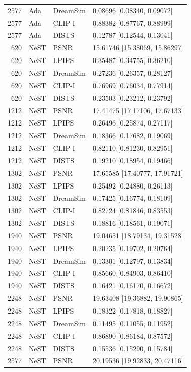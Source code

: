 \documentclass[10pt,letterpaper]{article}
\begin{document}
\begin{longtable}{@{}rlll@{}}
2577 & Ada & DreamSim & 0.08696 [0.08340, 0.09072]\\
2577 & Ada & CLIP-I & 0.88382 [0.87767, 0.88999]\\
2577 & Ada & DISTS & 0.12787 [0.12544, 0.13041]\\
620 & NeST & PSNR & 15.61746 [15.38069, 15.86297]\\
620 & NeST & LPIPS & 0.35487 [0.34755, 0.36210]\\
620 & NeST & DreamSim & 0.27236 [0.26357, 0.28127]\\
620 & NeST & CLIP-I & 0.76969 [0.76034, 0.77914]\\
620 & NeST & DISTS & 0.23503 [0.23212, 0.23792]\\
1212 & NeST & PSNR & 17.41475 [17.17106, 17.67133]\\
1212 & NeST & LPIPS & 0.26496 [0.25874, 0.27117]\\
1212 & NeST & DreamSim & 0.18366 [0.17682, 0.19069]\\
1212 & NeST & CLIP-I & 0.82110 [0.81230, 0.82951]\\
1212 & NeST & DISTS & 0.19210 [0.18954, 0.19466]\\
1302 & NeST & PSNR & 17.65585 [17.40777, 17.91721]\\
1302 & NeST & LPIPS & 0.25492 [0.24880, 0.26113]\\
1302 & NeST & DreamSim & 0.17425 [0.16774, 0.18109]\\
1302 & NeST & CLIP-I & 0.82724 [0.81846, 0.83553]\\
1302 & NeST & DISTS & 0.18816 [0.18561, 0.19071]\\
1940 & NeST & PSNR & 19.04651 [18.79134, 19.31528]\\
1940 & NeST & LPIPS & 0.20235 [0.19702, 0.20764]\\
1940 & NeST & DreamSim & 0.13301 [0.12797, 0.13834]\\
1940 & NeST & CLIP-I & 0.85660 [0.84903, 0.86410]\\
1940 & NeST & DISTS & 0.16421 [0.16170, 0.16672]\\
2248 & NeST & PSNR & 19.63408 [19.36882, 19.90865]\\
2248 & NeST & LPIPS & 0.18322 [0.17818, 0.18827]\\
2248 & NeST & DreamSim & 0.11495 [0.11055, 0.11952]\\
2248 & NeST & CLIP-I & 0.86890 [0.86184, 0.87572]\\
2248 & NeST & DISTS & 0.15536 [0.15290, 0.15784]\\
2577 & NeST & PSNR & 20.19536 [19.92833, 20.47116]\\

\end{longtable}
\end{document}
